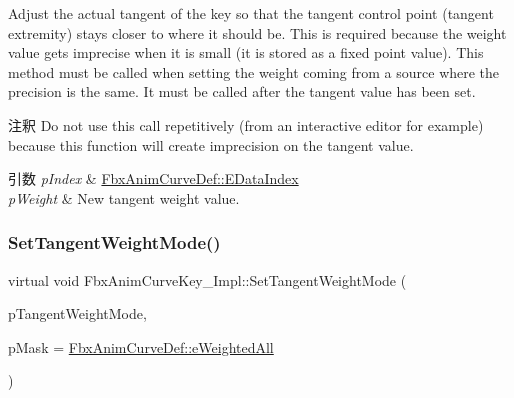 Adjust the actual tangent of the key so that the tangent control point (tangent extremity) stays closer to where it should be. This is required because the weight value gets imprecise when it is small (it is stored as a fixed point value). This method must be called when setting the weight coming from a source where the precision is the same. It must be called after the tangent value has been set. \begin{DoxyRemark}{注釈}
Do not use this call repetitively (from an interactive editor for example) because this function will create imprecision on the tangent value. 
\end{DoxyRemark}

\begin{DoxyParams}{引数}
{\em p\+Index} & \hyperlink{class_fbx_anim_curve_def_a3be261d961f8226235529b148cf80300}{Fbx\+Anim\+Curve\+Def\+::\+E\+Data\+Index} \\
\hline
{\em p\+Weight} & New tangent weight value. \\
\hline
\end{DoxyParams}
\mbox{\label{class_fbx_anim_curve_key___impl_a13388d0e2c45051c57a36aabddd311f9}} 
\subsubsection{\texorpdfstring{Set\+Tangent\+Weight\+Mode()}{SetTangentWeightMode()}}
{\footnotesize\ttfamily virtual void Fbx\+Anim\+Curve\+Key\+\_\+\+Impl\+::\+Set\+Tangent\+Weight\+Mode (\begin{DoxyParamCaption}\item[{\hyperlink{class_fbx_anim_curve_def_aeee6e9cc12501e10dbd3e5caaf66990e}{Fbx\+Anim\+Curve\+Def\+::\+E\+Weighted\+Mode}}]{p\+Tangent\+Weight\+Mode,  }\item[{\hyperlink{class_fbx_anim_curve_def_aeee6e9cc12501e10dbd3e5caaf66990e}{Fbx\+Anim\+Curve\+Def\+::\+E\+Weighted\+Mode}}]{p\+Mask = {\ttfamily \hyperlink{class_fbx_anim_curve_def_aeee6e9cc12501e10dbd3e5caaf66990ea4337e6853fab642c2a432ab1bb303922}{Fbx\+Anim\+Curve\+Def\+::e\+Weighted\+All}} }\end{DoxyParamCaption})\hspace{0.3cm}{\ttfamily [pure virtual]}}

